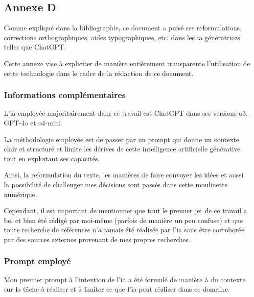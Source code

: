 \subsection{Annexe D} \label{sec:annexes_d}
Comme expliqué dans la bibliographie, ce document a puisé ses reformulations, corrections orthographiques, aides typographiques, etc. dans les \acrshort{ia} génératrices telles que ChatGPT.

Cette annexe vise à expliciter de manière entièrement transparente l'utilisation de cette technologie dans le cadre de la rédaction de ce document.

\subsubsection{Informations complémentaires}
L'\acrfull{ia} employée majoritairement dans ce travail est ChatGPT dans ses versions o3, GPT-4o et o4-mini.

La méthodologie employée est de passer par un prompt qui donne un contexte clair et structuré et limite les dérives de cette intelligence artificielle générative tout en exploitant ses capacités.

Ainsi, la reformulation du texte, les manières de faire convoyer les idées et aussi la possibilité de challenger mes décisions sont passés dans cette moulinette numérique.

Cependant, il est important de mentionner que tout le premier jet de ce travail a bel et bien été rédigé par moi-même (parfois de manière un peu confuse) et que toute recherche de références n'a jamais été réalisée par l'\acrshort{ia} sans être corroborée par des sources externes provenant de mes propres recherches.

\subsubsection{Prompt employé}
Mon premier prompt à l'intention de l'\acrshort{ia} a été formulé de manière à du contexte sur la tâche à réaliser et à limiter ce que l'\acrshort{ia} peut réaliser dans ce domaine.

